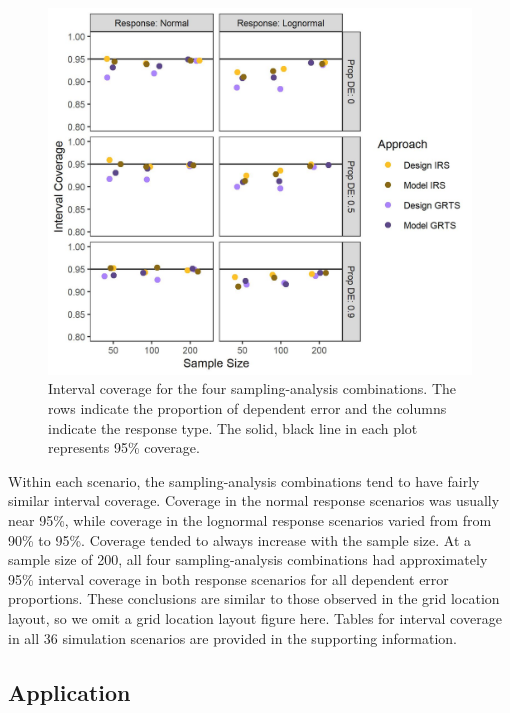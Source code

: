 \documentclass[]{elsarticle} %
\begin{document}
\begin{figure}
  \centering
  \includegraphics[width = 1\linewidth]{figures/coverage.jpeg}
  \caption{Interval coverage for the four sampling-analysis combinations. The rows indicate the proportion of dependent error and the columns indicate the response type. The solid, black line in each plot represents 95\% coverage.}
  \label{fig:figconf}
\end{figure}

Within each scenario, the sampling-analysis combinations tend to have
fairly similar interval coverage. Coverage in the normal response
scenarios was usually near 95\%, while coverage in the lognormal
response scenarios varied from from 90\% to 95\%. Coverage tended to
always increase with the sample size. At a sample size of 200, all four
sampling-analysis combinations had approximately 95\% interval coverage
in both response scenarios for all dependent error proportions. These
conclusions are similar to those observed in the grid location layout,
so we omit a grid location layout figure here. Tables for interval
coverage in all 36 simulation scenarios are provided in the supporting
information.

\hypertarget{sec:r_app}{%
\subsection{Application}\label{sec:r_app}}
\end{document}
